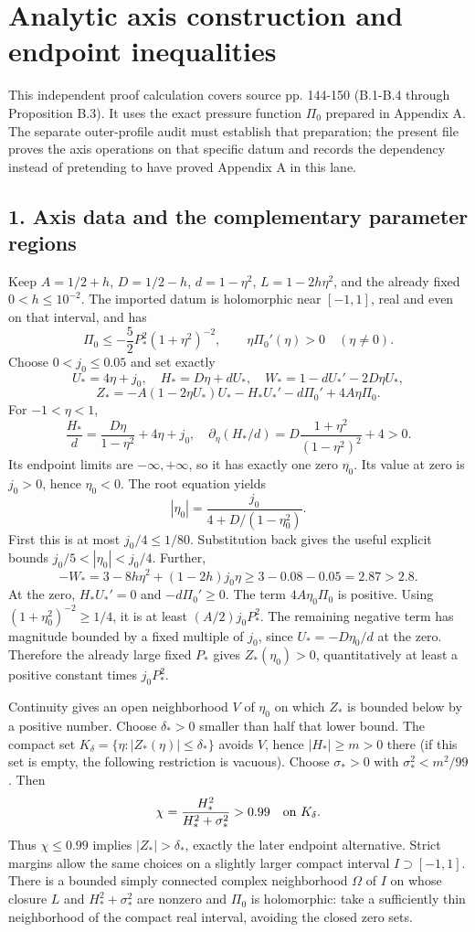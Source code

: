 \documentclass[10pt,a4paper]{article}
\begin{document}
\section{Analytic axis construction and endpoint inequalities}

This independent proof calculation covers source pp. 144-150 (B.1-B.4 through Proposition B.3). It uses the exact pressure function \(\Pi_0\) prepared in Appendix A. The separate outer-profile audit must establish that preparation; the present file proves the axis operations on that specific datum and records the dependency instead of pretending to have proved Appendix A in this lane.

\subsection{1. Axis data and the complementary parameter regions}

Keep \(A=1/2+h\), \(D=1/2-h\), \(d=1-\eta^2\), \(L=1-2h\eta^2\), and the already fixed \(0<h\le10^{-2}\). The imported datum is holomorphic near \([-1,1]\), real and even on that interval, and has
\[
\Pi_0\le-\frac52P_*^2(1+\eta^2)^{-2},\qquad
\eta\Pi_0'(\eta)>0\quad(\eta\ne0).
\]
Choose \(0<j_0\le0.05\) and set exactly
\[
U_*=4\eta+j_0,\quad H_*=D\eta+dU_*,
\quad W_*=1-dU_*'-2D\eta U_*,
\]
\[
Z_*=-A(1-2\eta U_*)U_*-H_*U_*'-d\Pi_0'+4A\eta\Pi_0.
\]
For \(-1<\eta<1\),
\[
\frac{H_*}{d}=\frac{D\eta}{1-\eta^2}+4\eta+j_0,
\quad \partial_\eta(H_*/d)
=D\frac{1+\eta^2}{(1-\eta^2)^2}+4>0.
\]
Its endpoint limits are \(-\infty,+\infty\), so it has exactly one zero \(\eta_0\). Its value at zero is \(j_0>0\), hence \(\eta_0<0\). The root equation yields
\[
|\eta_0|=\frac{j_0}{4+D/(1-\eta_0^2)}.
\]
First this is at most \(j_0/4\le1/80\). Substitution back gives the useful explicit bounds \(j_0/5<|\eta_0|<j_0/4\). Further,
\[
-W_*=3-8h\eta^2+(1-2h)j_0\eta
\ge3-0.08-0.05=2.87>2.8.
\]
At the zero, \(H_*U_*'=0\) and \(-d\Pi_0'\ge0\). The term \(4A\eta_0\Pi_0\) is positive. Using \((1+\eta_0^2)^{-2}\ge1/4\), it is at least \((A/2)j_0P_*^2\). The remaining negative term has magnitude bounded by a fixed multiple of \(j_0\), since \(U_*=-D\eta_0/d\) at the zero. Therefore the already large fixed \(P_*\) gives \(Z_*(\eta_0)>0\), quantitatively at least a positive constant times \(j_0P_*^2\).

Continuity gives an open neighborhood \(V\) of \(\eta_0\) on which \(Z_*\) is bounded below by a positive number. Choose \(\delta_*>0\) smaller than half that lower bound. The compact set \(K_\delta=\{\eta:|Z_*(\eta)|\le\delta_*\}\) avoids \(V\), hence \(|H_*|\ge m>0\) there (if this set is empty, the following restriction is vacuous). Choose \(\sigma_*>0\) with \(\sigma_*^2<m^2/99\). Then
\[
\chi=\frac{H_*^2}{H_*^2+\sigma_*^2}>0.99\quad\hbox{on }K_\delta.
\]
Thus \(\chi\le0.99\) implies \(|Z_*|>\delta_*\), exactly the later endpoint alternative. Strict margins allow the same choices on a slightly larger compact interval \(I\supset[-1,1]\). There is a bounded simply connected complex neighborhood \(\Omega\) of \(I\) on whose closure \(L\) and \(H_*^2+\sigma_*^2\) are nonzero and \(\Pi_0\) is holomorphic: take a sufficiently thin neighborhood of the compact real interval, avoiding the closed zero sets.
\end{document}
